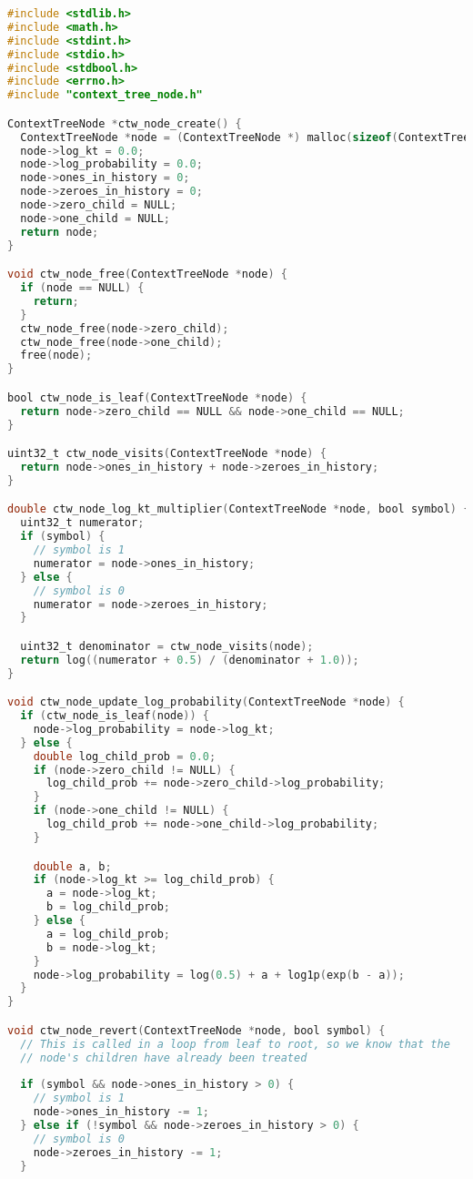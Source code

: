 \documentclass[fancychapters]{report}   	%
\begin{document}
\begin{lstlisting}[language=C,caption={context_tree_node.c}]
#include <stdlib.h>
#include <math.h>
#include <stdint.h>
#include <stdio.h>
#include <stdbool.h>
#include <errno.h>
#include "context_tree_node.h"

ContextTreeNode *ctw_node_create() {
  ContextTreeNode *node = (ContextTreeNode *) malloc(sizeof(ContextTreeNode));
  node->log_kt = 0.0;
  node->log_probability = 0.0;
  node->ones_in_history = 0;
  node->zeroes_in_history = 0;
  node->zero_child = NULL;
  node->one_child = NULL;
  return node;
}

void ctw_node_free(ContextTreeNode *node) {
  if (node == NULL) {
    return;
  }
  ctw_node_free(node->zero_child);
  ctw_node_free(node->one_child);
  free(node);
}

bool ctw_node_is_leaf(ContextTreeNode *node) {
  return node->zero_child == NULL && node->one_child == NULL;
}

uint32_t ctw_node_visits(ContextTreeNode *node) {
  return node->ones_in_history + node->zeroes_in_history;
}

double ctw_node_log_kt_multiplier(ContextTreeNode *node, bool symbol) {
  uint32_t numerator;
  if (symbol) {
    // symbol is 1
    numerator = node->ones_in_history;
  } else {
    // symbol is 0
    numerator = node->zeroes_in_history;
  }

  uint32_t denominator = ctw_node_visits(node);
  return log((numerator + 0.5) / (denominator + 1.0));
}

void ctw_node_update_log_probability(ContextTreeNode *node) {
  if (ctw_node_is_leaf(node)) {
    node->log_probability = node->log_kt;
  } else {
    double log_child_prob = 0.0;
    if (node->zero_child != NULL) {
      log_child_prob += node->zero_child->log_probability;
    }
    if (node->one_child != NULL) {
      log_child_prob += node->one_child->log_probability;
    }

    double a, b;
    if (node->log_kt >= log_child_prob) {
      a = node->log_kt;
      b = log_child_prob;
    } else {
      a = log_child_prob;
      b = node->log_kt;
    }
    node->log_probability = log(0.5) + a + log1p(exp(b - a));
  }
}

void ctw_node_revert(ContextTreeNode *node, bool symbol) {
  // This is called in a loop from leaf to root, so we know that the
  // node's children have already been treated
  
  if (symbol && node->ones_in_history > 0) {
    // symbol is 1
    node->ones_in_history -= 1;
  } else if (!symbol && node->zeroes_in_history > 0) {
    // symbol is 0
    node->zeroes_in_history -= 1;
  }


\end{lstlisting}
\end{document}
